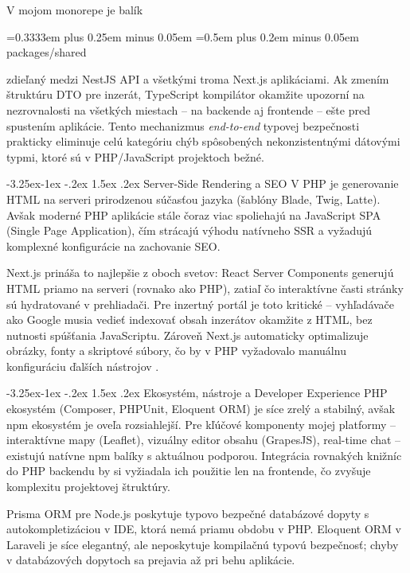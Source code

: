 \documentclass[12pt]{article}
\makeatletter
\newcommand{\hlcode}[1]{%
  \allowbreak
  \begingroup
  \setlength{\fboxsep}{2.4pt}%
  \setlength{\fboxrule}{0pt}%
  \colorbox{gray!15}{%
    \strut
    {\ttfamily\small
     \hyphenpenalty=10000
     \exhyphenpenalty=10000
     \spaceskip=0.3333em plus 0.25em minus 0.05em
     \xspaceskip=0.5em plus 0.2em minus 0.05em
     #1}%
  }%
  \endgroup
  \allowbreak
}
\renewcommand{\subsubsection}{\@startsection{subsubsection}{3}{\z@}%
  {-3.25ex\@plus -1ex \@minus -.2ex}%
  {1.5ex \@plus .2ex}%
  {\normalfont\large\bfseries}}
\makeatother
\begin{document}
V mojom monorepe je balík \hlcode{packages/shared} zdieľaný medzi NestJS API a všetkými troma Next.js aplikáciami. Ak zmením štruktúru DTO pre inzerát, TypeScript kompilátor okamžite upozorní na nezrovnalosti na všetkých miestach -- na backende aj frontende -- ešte pred spustením aplikácie. Tento mechanizmus \emph{end-to-end} typovej bezpečnosti \parencite{cherny2019typescript} prakticky eliminuje celú kategóriu chýb spôsobených nekonzistentnými dátovými typmi, ktoré sú v PHP/JavaScript projektoch bežné.

\subsubsection{Server-Side Rendering a SEO}
\noindent
V PHP je generovanie HTML na serveri prirodzenou súčasťou jazyka (šablóny Blade, Twig, Latte). Avšak moderné PHP aplikácie stále čoraz viac spoliehajú na JavaScript SPA (Single Page Application), čím strácajú výhodu natívneho SSR a vyžadujú komplexné konfigurácie na zachovanie SEO.

Next.js prináša to najlepšie z oboch svetov: React Server Components generujú HTML priamo na serveri (rovnako ako PHP), zatiaľ čo interaktívne časti stránky sú hydratované v prehliadači. Pre inzertný portál je toto kritické -- vyhľadávače ako Google musia vedieť indexovať obsah inzerátov okamžite z HTML, bez nutnosti spúšťania JavaScriptu. Zároveň Next.js automaticky optimalizuje obrázky, fonty a skriptové súbory, čo by v PHP vyžadovalo manuálnu konfiguráciu ďalších nástrojov \parencite{riva2022nextjs}.

\subsubsection{Ekosystém, nástroje a Developer Experience}
\noindent
PHP ekosystém (Composer, PHPUnit, Eloquent ORM) je síce zrelý a stabilný, avšak npm ekosystém je oveľa rozsiahlejší. Pre kľúčové komponenty mojej platformy -- interaktívne mapy (Leaflet), vizuálny editor obsahu (GrapesJS), real-time chat -- existujú natívne npm balíky s aktuálnou podporou. Integrácia rovnakých knižníc do PHP backendu by si vyžiadala ich použitie len na frontende, čo zvyšuje komplexitu projektovej štruktúry.

Prisma ORM pre Node.js poskytuje typovo bezpečné databázové dopyty s autokompletizáciou v IDE, ktorá nemá priamu obdobu v PHP. Eloquent ORM v Laraveli je síce elegantný, ale neposkytuje kompilačnú typovú bezpečnosť; chyby v databázových dopytoch sa prejavia až pri behu aplikácie.
\end{document}
